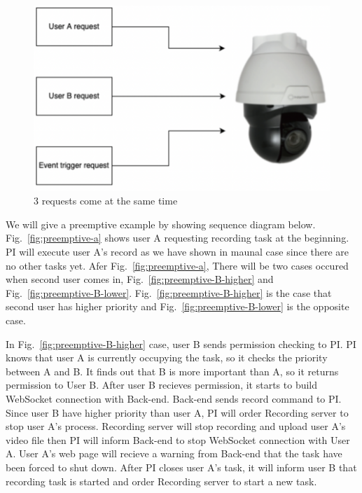 \begin{figure}[H]
    \centering
    \includegraphics[width=\textwidth]{figsrc/preemptive-example.png}
    \caption{3 requests come at the same time \label{fig:preemptive-example}}
\end{figure}

We will give a preemptive example by showing sequence diagram below. Fig.~\ref{fig:preemptive-a} shows user A requesting recording task at the beginning. PI will execute user A's record as we have shown in maunal case since there are no other tasks yet. Afer Fig.~\ref{fig:preemptive-a}, There will be two cases occured when second user comes in, Fig.~\ref{fig:preemptive-B-higher} and Fig.~\ref{fig:preemptive-B-lower}. Fig.~\ref{fig:preemptive-B-higher} is the case that second user has higher priority and Fig.~\ref{fig:preemptive-B-lower} is the opposite case. 

In Fig.~\ref{fig:preemptive-B-higher} case, user B sends permission checking to PI. PI knows that user A is currently occupying the task, so it checks the priority between A and B. It finds out that B is more important than A, so it returns permission to User B. After user B recieves permission, it starts to build WebSocket connection with Back-end. Back-end sends record command to PI. Since user B have higher priority than user A, PI will order Recording server to stop user A's process. Recording server will stop recording and upload user A's video file then PI will inform Back-end to stop WebSocket connection with User A. User A's web page will recieve a warning from Back-end that the task have been forced to shut down. After PI closes user A's task, it will inform user B that recording task is started and order Recording server to start a new task.

